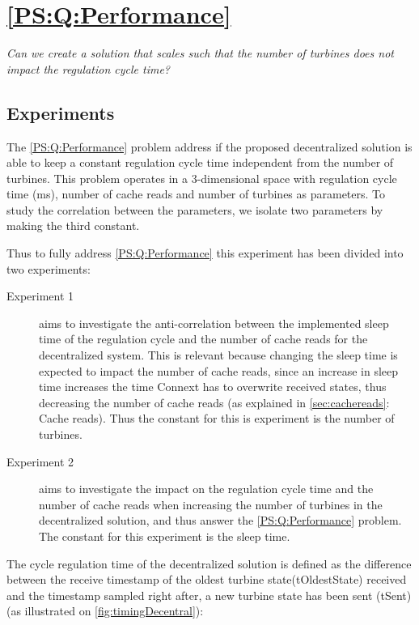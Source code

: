 
\section{\ref{PS:Q:Performance}}

\textit{Can we create a solution that scales such that the number of turbines does not impact the regulation cycle time?}

\subsection{Experiments}
\label{sec:Exper:perfom}


The \ref{PS:Q:Performance} problem address if the proposed decentralized solution is able to keep a constant regulation cycle time independent from the number of turbines. This problem operates in a 3-dimensional space with regulation cycle time (ms), number of cache reads and number of turbines as parameters. To study the correlation between the parameters, we isolate two parameters by making the third constant.

Thus to fully address \ref{PS:Q:Performance} this experiment has been divided into two experiments:
 
\begin{description}
	\item[Experiment 1] aims to investigate the anti-correlation between the implemented sleep time of the regulation cycle and the number of cache reads for the decentralized system. This is relevant because changing the sleep time is expected to impact the number of cache reads, since an increase in sleep time increases the time Connext has to overwrite received states, thus decreasing the number of cache reads (as explained in \cref{sec:cachereads}: Cache reads). Thus the constant for this is experiment is the number of turbines.
	\item[Experiment 2] aims to investigate the impact on the regulation cycle time and the number of cache reads when increasing the number of turbines in the decentralized solution, and thus answer the \ref{PS:Q:Performance} problem. The constant for this experiment is the sleep time.
\end{description}

The cycle regulation time of the decentralized solution is defined as the difference between the receive timestamp of the oldest turbine state(tOldestState) received and the timestamp sampled right after, a new turbine state has been sent (tSent) (as illustrated on \cref{fig:timingDecentral}):

